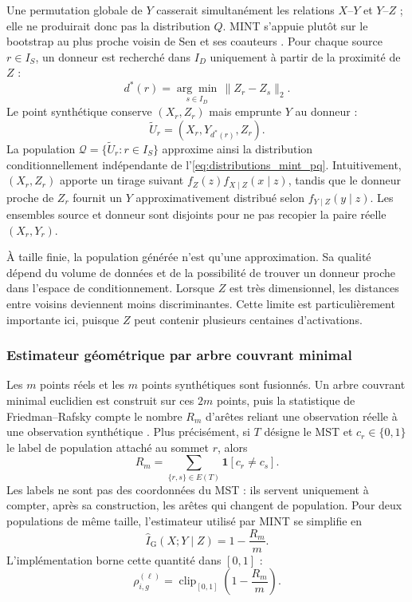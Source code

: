 Une permutation globale de $Y$ casserait simultanément les relations
$X$--$Y$ et $Y$--$Z$ ; elle ne produirait donc pas la distribution $Q$. MINT
s'appuie plutôt sur le bootstrap au plus proche voisin de Sen et ses coauteurs
\cite{sen2017ci}. Pour chaque source $r\in I_S$, un donneur est recherché dans
$I_D$ uniquement à partir de la proximité de $Z$ :
\begin{equation}
    d^*(r)
    =\underset{s\in I_D}{\arg\min}\,
      \lVert Z_r-Z_s\rVert_2.
    \label{eq:donneur_mint}
\end{equation}
Le point synthétique conserve $(X_r,Z_r)$ mais emprunte $Y$ au donneur :
\begin{equation}
    \widetilde{U}_r=(X_r,Y_{d^*(r)},Z_r).
\end{equation}
La population
$\mathcal{Q}=\{\widetilde{U}_r:r\in I_S\}$ approxime ainsi la distribution
conditionnellement indépendante de l'\autoref{eq:distributions_mint_pq}.
Intuitivement, $(X_r,Z_r)$ apporte un tirage suivant
$f_Z(z)f_{X\mid Z}(x\mid z)$, tandis que le donneur proche de $Z_r$ fournit un
$Y$ approximativement distribué selon $f_{Y\mid Z}(y\mid z)$. Les ensembles
source et donneur sont disjoints pour ne pas recopier la paire réelle
$(X_r,Y_r)$.

À taille finie, la population générée n'est qu'une approximation. Sa qualité
dépend du volume de données et de la possibilité de trouver un donneur proche
dans l'espace de conditionnement. Lorsque $Z$ est très dimensionnel, les
distances entre voisins deviennent moins discriminantes. Cette limite est
particulièrement importante ici, puisque $Z$ peut contenir plusieurs centaines
d'activations.

\subsubsection{Estimateur géométrique par arbre couvrant minimal}

Les $m$ points réels et les $m$ points synthétiques sont fusionnés. Un arbre
couvrant minimal euclidien est construit sur ces $2m$ points, puis la
statistique de Friedman--Rafsky compte le nombre $R_m$ d'arêtes reliant une
observation réelle à une observation synthétique
\cite{friedman1979multivariate}. Plus précisément, si $T$ désigne le MST et
$c_r\in\{0,1\}$ le label de population attaché au sommet $r$, alors
\begin{equation}
    R_m
    =\sum_{\{r,s\}\in E(T)}
      \mathbf{1}\!\left[c_r\neq c_s\right].
    \label{eq:friedman_rafsky_mint}
\end{equation}
Les labels ne sont pas des coordonnées du MST : ils servent uniquement à
compter, après sa construction, les arêtes qui changent de population. Pour
deux populations de même taille,
l'estimateur utilisé par MINT se simplifie en
\begin{equation}
    \widehat{I}_{\mathrm{G}}(X;Y\mid Z)
    =1-\frac{R_m}{m}.
\end{equation}
L'implémentation borne cette quantité dans $[0,1]$ :
\begin{equation}
    \rho_{i,g}^{(\ell)}
    =\operatorname{clip}_{[0,1]}
      \left(1-\frac{R_m}{m}\right).
    \label{eq:score_mint_estime}
\end{equation}

